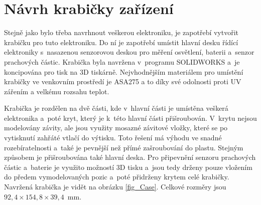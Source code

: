 \chapter{Návrh krabičky zařízení}

Stejně jako bylo třeba navrhnout veškerou elektroniku, je zapotřebí vytvořit krabičku pro tuto elektroniku. Do ní je zapotřebí umístit hlavní desku řídící elektroniky s~nasazenou senzorovou deskou pro měření osvětlení, baterii a~senzor prachových částic. Krabička byla navržena v~programu SOLIDWORKS a~je koncipována pro tisk na 3D tiskárně. Nejvhodnějším materiálem pro umístění krabičky ve venkovním prostředí je ASA275 a to díky své odolnosti proti UV zářením a velkému rozsahu teplot.

Krabička je rozdělen na dvě části, kde v~hlavní části je umístěna veškerá elektronika a~poté kryt, který je k~této hlavní části přišroubován. V~krytu nejsou modelovány závity, ale jsou využity mosazné závitové vložky, které se po vytisknutí zahřáté vtlačí do výtisku. Toto řešení má výhodu ve snadné rozebíratelnosti a~také je pevnější než přímé zašroubování do plastu. Stejným způsobem je přišroubována také hlavní deska. Pro připevnění senzoru prachových částic a~baterie je využito možností 3D tisku a~jsou tedy drženy pouze vložením do předem vymodelovaných pozic a~poté přidrženy krytem celé krabičky. Navržená krabička je vidět na obrázku \ref{fig_Case}. Celkové rozměry jsou $92,4 \times 154,8 \times 39,4$\SI{}{\milli\metre}.

